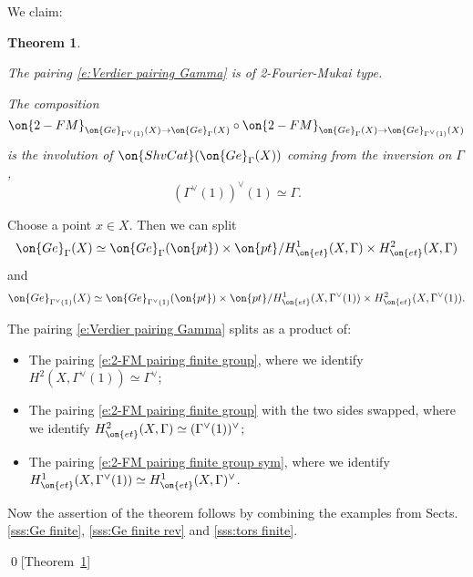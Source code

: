 \documentclass[9pt]{amsart}
\newtheorem{thm}[subsubsection]{Theorem}
\theoremstyle{remark}
\theoremstyle{definition}
\theoremstyle{remark}
\newcommand{\thmref}[1]{Theorem~\ref{#1}}
\numberwithin{equation}{section}
\begin{document}
\sssec{}

We claim:

\begin{thm} \label{t:Verdier FM} \hfill

\smallskip

 The pairing \eqref{e:Verdier pairing Gamma} is of 2-Fourier-Mukai type.

\smallskip

 The composition 
$$\on{2-FM}_{\on{Ge}_{\Gamma^\vee(1)}(X)\to \on{Ge}_{\Gamma}(X)}\circ 
\on{2-FM}_{\on{Ge}_{\Gamma}(X)\to \on{Ge}_{\Gamma^\vee(1)}(X)}$$
is the involution of $\on{ShvCat}(\on{Ge}_{\Gamma}(X))$ coming 
from the inversion on $\Gamma$,
$$(\Gamma^\vee(1))^\vee(1)\simeq \Gamma.$$
\end{thm}

\sssec{Proof of \thmref{t:Verdier FM}}

Choose a point $x\in X$. Then we can split
$$\on{Ge}_{\Gamma}(X)\simeq \on{Ge}_\Gamma(\on{pt}) \times \on{pt}/H^1_{\on{et}}(X,\Gamma) \times H^2_{\on{et}}(X,\Gamma)$$
and
$$\on{Ge}_{\Gamma^\vee(1)}(X)\simeq \on{Ge}_{\Gamma^\vee(1)}(\on{pt}) 
\times \on{pt}/H^1_{\on{et}}(X,\Gamma^\vee(1)) \times H^2_{\on{et}}(X,\Gamma^\vee(1)).$$

The pairing \eqref{e:Verdier pairing Gamma} splits as a product of:

\begin{itemize}

\item The pairing \eqref{e:2-FM pairing finite group}, where we identify
$H^2(X,\Gamma^\vee(1))\simeq \Gamma^\vee$;

\item The pairing \eqref{e:2-FM pairing finite group} with the two sides swapped, where we identify $H^2_{\on{et}}(X,\Gamma)\simeq (\Gamma^\vee(1))^\vee$;

\item The pairing \eqref{e:2-FM pairing finite group sym}, where we identify 
$H_{\on{et}}^1(X,\Gamma^\vee(1))\simeq H_{\on{et}}^1(X,\Gamma)^\vee$. 

\end{itemize}

Now the assertion of the theorem follows by combining the examples from 
Sects. \ref{sss:Ge finite}, \ref{sss:Ge finite rev} and \ref{sss:tors finite}. 

\qed[\thmref{t:Verdier FM}]

\sssec{} \label{sss:fibers of 2-FM}
\end{document}
